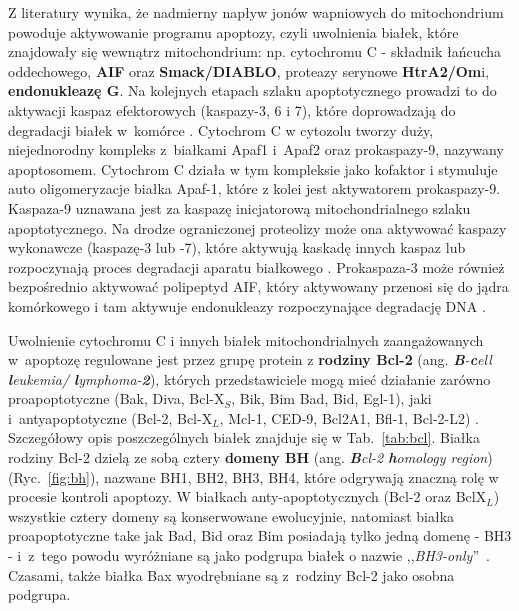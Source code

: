 Z literatury wynika, że nadmierny napływ jonów wapniowych do mitochondrium powoduje aktywowanie programu apoptozy, czyli uwolnienia białek, które znajdowały się wewnątrz mitochondrium: np. cytochromu C - składnik łańcucha oddechowego, \textbf{AIF} oraz \textbf{Smack/DIABLO}, proteazy serynowe \textbf{HtrA2/Om}i, \textbf{endonukleazę G}. Na kolejnych etapach szlaku apoptotycznego prowadzi to do aktywacji kaspaz efektorowych (kaspazy-3, 6 i 7), które doprowadzają do degradacji białek w~komórce \cite{Desagher2000,Martins2002,Roy2008}. Cytochrom C w cytozolu tworzy duży, niejednorodny kompleks z~białkami Apaf1 i~Apaf2 oraz prokaspazy-9, nazywany apoptosomem. Cytochrom C działa w tym kompleksie jako kofaktor i stymuluje auto oligomeryzacje białka Apaf-1, które z kolei jest aktywatorem prokaspazy-9. Kaspaza-9 uznawana jest za kaspazę inicjatorową mitochondrialnego szlaku apoptotycznego. Na drodze ograniczonej proteolizy może ona aktywować kaspazy wykonawcze (kaspazę-3 lub -7), które aktywują kaskadę innych kaspaz lub rozpoczynają proces degradacji aparatu białkowego \cite{Chang2000,Nicholson1999}. Prokaspaza-3 może również bezpośrednio aktywować polipeptyd AIF, który aktywowany przenosi się do jądra komórkowego i tam aktywuje endonukleazy rozpoczynające degradację DNA \cite{Chang2000,Cohen1997}. 

Uwolnienie cytochromu C i innych białek mitochondrialnych zaangażowanych w~apoptozę regulowane jest przez grupę protein z \textbf{rodziny Bcl-2} (ang. \emph{\textbf{B}-\textbf{c}ell \textbf{l}eukemia/ \textbf{l}ymphoma-\textbf{2}}), których przedstawiciele mogą mieć działanie zarówno proapoptotyczne (Bak, Diva, Bcl-X$_S$, Bik, Bim Bad, Bid, Egl-1), jaki i~antyapoptotyczne (Bcl-2, Bcl-X$_L$, Mcl-1, CED-9, Bcl2A1, Bfl-1, Bcl-2-L2) \cite{Chao1998}. Szczegółowy opis poszczególnych białek znajduje się w Tab.~\ref{tab:bcl}. Białka rodziny Bcl-2 dzielą ze sobą cztery \textbf{domeny BH} (ang. \textit{\textbf{B}cl-2 \textbf{h}omology region})(Ryc.~\ref{fig:bh}), nazwane BH1, BH2, BH3, BH4, które odgrywają znaczną rolę w procesie kontroli apoptozy. W białkach anty-apoptotycznych (Bcl-2 oraz BclX$_L$) wszystkie cztery domeny są konserwowane ewolucyjnie, natomiast białka proapoptotyczne take jak Bad, Bid oraz Bim posiadają tylko jedną domenę - BH3 - i~z~tego powodu wyróżniane są jako podgrupa białek o nazwie ,,\textit{BH3-only}''~\cite{Lomonosova2008}. Czasami, także białka Bax wyodrębniane są z~rodziny Bcl-2 jako osobna podgrupa.

